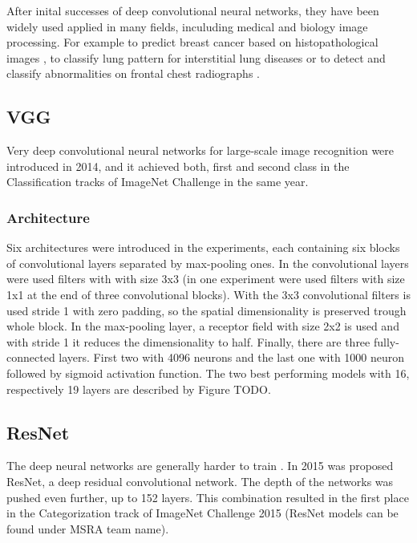 After inital successes of deep convolutional neural networks, they have been widely used
applied in many fields, inculuding medical and biology image processing. For example to 
predict breast cancer based on histopathological images \cite{BreastCNN}, to classify
lung pattern for interstitial lung diseases \cite{LungCNN} or to detect and classify
abnormalities on frontal chest radiographs \cite{ChestCNN}.


\subsection{VGG}
Very deep convolutional neural networks for large-scale image recognition \cite{VGG} were 
introduced in 2014, and it achieved both, first and second class in the Classification tracks of 
ImageNet Challenge \cite{IN2014} in the same year.


\subsubsection{Architecture}
Six architectures were introduced in the experiments, each containing six blocks of convolutional
layers separated by max-pooling ones. In the convolutional layers were used filters with
with size 3x3 (in one experiment were used filters with size 1x1 at the end of three convolutional blocks).
With the 3x3 convolutional filters is used stride 1 with zero padding, so the spatial dimensionality
is preserved trough whole block. In the max-pooling layer, a receptor field with size 2x2 is used and with stride 1 it 
reduces the dimensionality to half. Finally, there are three fully-connected layers. First two with 4096 neurons and
the last one with 1000 neuron followed by sigmoid activation function. The two best performing models with 16, respectively 19
layers are described by Figure TODO.




\subsection{ResNet}
The deep neural networks are generally harder to train \cite{HardDnn}. In 2015 was proposed ResNet\cite{ResNet}, 
a deep residual convolutional network. The depth of the networks was pushed even further, up to 152 layers. 
This combination resulted in the first place in the Categorization track of ImageNet Challenge 2015\cite{IN2015}
(ResNet models can be found under MSRA team name).


